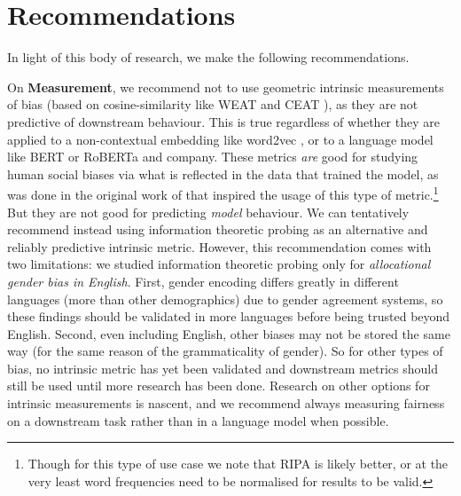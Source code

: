 \section{Recommendations}
In light of this body of research, we make the following recommendations. 

On \textbf{Measurement}, we recommend not to use geometric intrinsic measurements of bias (based on cosine-similarity like WEAT \citep{Caliskan2017SemanticsDA} and CEAT \citep{guo_and_caliskan}), as they are not predictive of downstream behaviour. This is true regardless of whether they are applied to a non-contextual embedding like word2vec \citep{mikolov_word2vec}, or to a language model like BERT \citep{devlin-etal-2019-bert} or RoBERTa \citep{liu2019roberta} and company. These metrics \textit{are} good for studying human social biases via what is reflected in the data that trained the model, as was done in the original work of \citet{Caliskan2017SemanticsDA} that inspired the usage of this type of metric.\footnote{Though for this type of use case we note that RIPA \citep{ethayarajh-etal-2019-understanding} is likely better, or at the very least word frequencies need to be normalised for results to be valid.} But they are not good for predicting \textit{model} behaviour. We can tentatively recommend instead using information theoretic probing as an alternative and reliably predictive intrinsic metric. However, this recommendation comes with two limitations: we studied information theoretic probing only for \textit{allocational gender bias in English}. First, gender encoding differs greatly in different languages (more than other demographics) due to gender agreement systems, so these findings should be validated in more languages before being trusted beyond English. Second, even including English, other biases may not be stored the same way (for the same reason of the grammaticality of gender). So for other types of bias, no intrinsic metric has yet been validated and downstream metrics should still be used until more research has been done. Research on other options for intrinsic measurements is nascent, and we recommend always measuring fairness on a downstream task rather than in a language model when possible.
